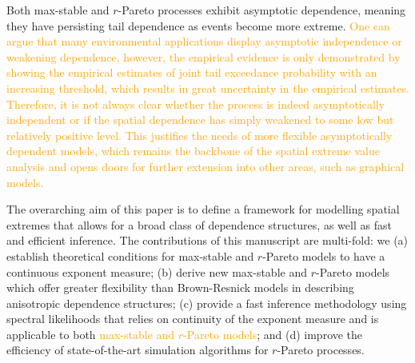 \documentclass[12pt]{article}
\newcommand{\PZ}{\textcolor{orange}}
\begin{document}

Both max-stable and $r$-Pareto processes exhibit asymptotic dependence, meaning they have persisting tail dependence as events become more extreme. \PZ{One can argue that many environmental applications display asymptotic independence \citep[e.g.,][]{Bopp.etal:2021, Huser.Wadsworth:2019} or weakening dependence, however, the empirical evidence is only demonstrated by showing the empirical estimates of joint tail exceedance probability with an increasing threshold, which results in great uncertainty in the empirical estimates. Therefore, it is not always clear whether the process is indeed asymptotically independent or if the spatial dependence has simply weakened to some low but relatively positive level. This justifies the needs of more flexible asymptotically dependent models, which remains the backbone of the spatial extreme value analysis and opens doors for further extension into other areas, such as graphical models.}

The overarching aim of this paper is to define a framework for modelling spatial extremes that allows for a broad class of dependence structures, as well as fast and efficient inference. The contributions of this manuscript are multi-fold: we (a) establish theoretical conditions for max-stable and $r$-Pareto models to have a continuous exponent measure; (b) derive new max-stable and $r$-Pareto models which offer greater flexibility than Brown-Resnick models in describing anisotropic dependence structures; %
(c) provide a fast inference methodology using spectral likelihoods that relies on continuity of the exponent measure and is applicable to both \PZ{max-stable and $r$-Pareto models}; and (d) improve the efficiency of state-of-the-art simulation algorithms for $r$-Pareto processes.    
\end{document}
